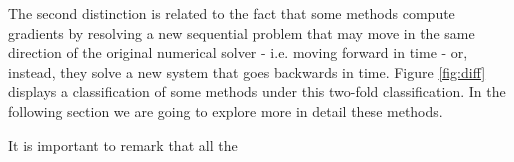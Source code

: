The second distinction is related to the fact that some methods compute gradients by resolving a new sequential problem that may move in the same direction of the original numerical solver - i.e. moving forward in time - or, instead, they solve a new system that goes backwards in time. 
Figure \ref{fig:diff} displays a classification of some methods under this two-fold classification. In the following section we are going to explore more in detail these methods.

It is important to remark that all the 